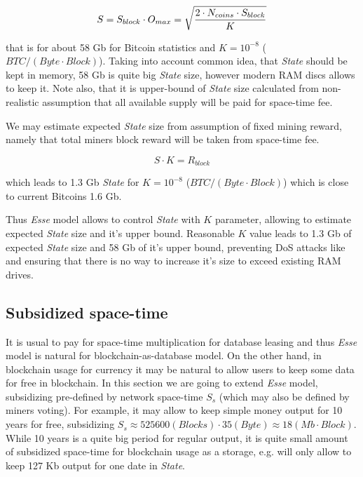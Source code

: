 \documentclass[]{article}   %
\newcommand{\esse}{\textit{Esse}}
\newcommand{\state}{\textit{State}}
\begin{document}
\begin{equation}
\label{eq:statesizemax}
S = S_{block} \cdot O_{max} = \sqrt { 2 \cdot N_{coins} \cdot S_{block} \over K}
\end{equation}

that is for about 58 Gb for Bitcoin statistics and $K=10^{-8}$ ($BTC / (Byte \cdot Block)$). Taking into account common idea, that \state{} should be kept in memory, 58 Gb is quite big \state{} size, however modern RAM discs allows to keep it. Note also, that it is upper-bound of \state{} size calculated from non-realistic assumption that all available supply will be paid for space-time fee.

We may estimate expected \state{} size from assumption of fixed mining reward, namely that total miners block reward will be taken from space-time fee.

\begin{equation}
\label{eq:statesizeexp}
S \cdot K = R_{block}
\end{equation}

which leads to 1.3 Gb \state{} for $K=10^{-8}$ ($BTC / (Byte \cdot Block)$) which is close to current Bitcoins 1.6 Gb.

Thus \esse{} model allows to control \state{} with $K$ parameter, allowing to estimate expected \state{} size and it's upper bound. Reasonable $K$ value leads to 1.3 Gb of expected \state{} size and 58 Gb of it's upper bound, preventing DoS attacks like \cite{bitcoin2015flood} and ensuring that there is no way to increase it's size to exceed existing RAM drives.

\subsection{Subsidized space-time}

It is usual to pay for space-time multiplication for database leasing and thus \esse{} model is natural for blockchain-as-database model. On the other hand, in blockchain usage for currency it may be natural to allow users to keep some data for free in blockchain. In this section we are going to extend \esse{} model, subsidizing pre-defined by network space-time $S_s$ (which may also be defined by miners voting). For example, it may allow to keep simple money output for 10 years for free, subsidizing $S_s \approx 525600 (Blocks) \cdot 35 (Byte) \approx 18 (Mb \cdot Block)$. While 10 years is a quite big period for regular output, it is quite small amount of subsidized space-time for blockchain usage as a storage, e.g. will only allow to keep 127 Kb output for one date in \state{}.
\end{document}
